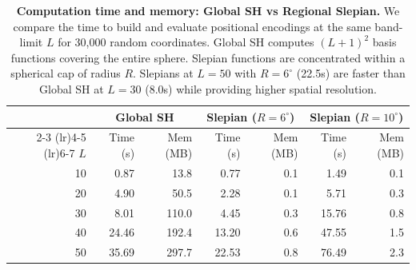 \begin{table}[t]
\centering
\small
\setlength{\tabcolsep}{4pt}
\caption{\textbf{Computation time and memory: Global SH vs Regional {\color{slepianpurple}Slepian}.}
We compare the time to build and evaluate positional encodings at the same band-limit $L$ for 30,000 random coordinates.
Global SH computes $(L{+}1)^2$ basis functions covering the entire sphere.
{\color{slepianpurple}Slepian} functions are concentrated within a spherical cap of radius $R$.
{\color{slepianpurple}Slepians} at $L{=}50$ with $R{=}6^\circ$ (22.5s) are faster than Global SH at $L{=}30$ (8.0s) while providing higher spatial resolution.}
\label{tab:timing_unified}
\vspace{1ex}

\begin{tabular}{@{}r rr rr rr@{}}
\toprule
& \multicolumn{2}{c}{\textbf{Global SH}}
& \multicolumn{2}{c}{\textbf{{\color{slepianpurple}Slepian} ($R{=}6^\circ$)}}
& \multicolumn{2}{c}{\textbf{{\color{slepianpurple}Slepian} ($R{=}10^\circ$)}} \\
\cmidrule(lr){2-3} \cmidrule(lr){4-5} \cmidrule(lr){6-7}
$L$ & Time (s) & Mem (MB) & Time (s) & Mem (MB) & Time (s) & Mem (MB) \\
\midrule
10 & 0.87  & 13.8  & 0.77  & 0.1  & 1.49  & 0.1  \\
20 & 4.90  & 50.5  & 2.28  & 0.1  & 5.71  & 0.3  \\
30 & 8.01  & 110.0 & 4.45  & 0.3  & 15.76 & 0.8  \\
40 & 24.46 & 192.4 & 13.20 & 0.6  & 47.55 & 1.5  \\
50 & 35.69 & 297.7 & 22.53 & 0.8  & 76.49 & 2.3  \\
\bottomrule
\end{tabular}
\end{table}
